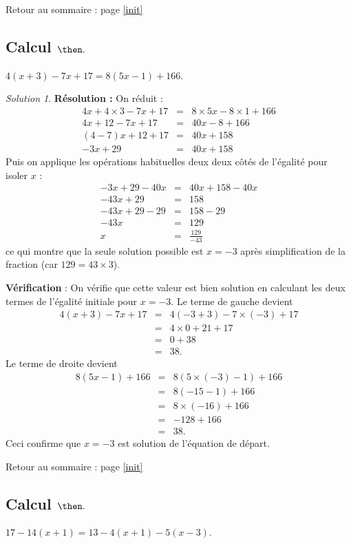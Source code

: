 \documentclass[14pt]{article}
\theoremstyle{remark}
\newtheorem*{sol}{Solution}
\newcounter{n}
\renewcommand{\it}{Retour au sommaire : page \ref{init}
	\subsection{Calcul $ \mathbf{ \then}.$}\label{\then} \stepcounter{n} }
\theoremstyle{plain}
\begin{document}
\it $4(x+3)-7x+17 = 8(5x-1)+166$. 
\begin{sol}
\textbf{Résolution :}
On réduit : 
\begin{eqnarray*}
4x+4\times 3-7x+17 &=& 8\times5x -8\times1 +166\\
4x+12-7x+17&=& 40x-8+166\\
(4-7)x+12+17 &=&40x+158 \\
-3x+29 &=&40x+158\end{eqnarray*}
Puis on applique les opérations habituelles deux deux côtés de l'égalité pour isoler $x$ : 
\begin{eqnarray*}
-3x+29-40x&=& 40x+158-40x\\
-43x+29&=& 158\\
-43x+29-29 &=& 158-29\\
-43x &=&129\\
x &=& \frac{129}{-43}
\end{eqnarray*}
ce qui montre que la seule solution possible est $x=-3$ après simplification de la fraction (car $129=43\times3$). 

\textbf{Vérification} : On vérifie que cette valeur est bien solution en calculant les deux termes de l'égalité initiale pour $x=-3$.
Le terme de gauche devient 
\begin{eqnarray*}
4(x+3)-7x+17 &=&  4(-3+3)-7\times(-3)+17\\
&=& 4\times 0 +21+17\\
&=&0+38\\
&=& 38.\end{eqnarray*}
Le terme de droite devient 
\begin{eqnarray*}
8(5x-1)+166&=& 8(5\times (-3)-1)+166\\
&=& 8(-15-1)+166\\
&=& 8\times (-16)+166\\
&=& -128+166\\
&=& 38.\end{eqnarray*}
Ceci confirme que $x=-3$ est solution de l'équation de départ.
\end{sol}
\it $17-14(x+1)= 13-4(x+1)-5(x-3)$. 
\end{document}
